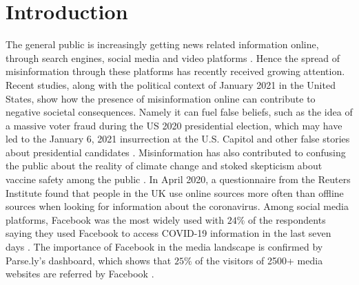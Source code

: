 \documentclass[review]{elsarticle}
\begin{document}
\linenumbers

\section{Introduction}

The general public is increasingly getting news related information online, through search engines, social media and video platforms \citep{mitchell2016modern}.
Hence the spread of misinformation through these platforms has recently received growing attention.
Recent studies, along with the political context of January 2021 in the United States, show how the presence of misinformation online can contribute to negative societal consequences.
Namely it can fuel false beliefs, such as the idea of a massive voter fraud during the US 2020 presidential election, which may have led to the January 6, 2021 insurrection at the U.S. Capitol \citep{benkler2020mail} and other false stories about presidential candidates \citep{allcott2017social}. 
Misinformation has also contributed to confusing the public about the reality of climate change \citep{brulle30years, porter2019can} and stoked skepticism about vaccine safety among the public \citep{featherstone2020feeling, lahouati2020spread}. 
In April 2020, a questionnaire from the Reuters Institute found that people in the UK use online sources more often than offline sources when looking for information about the coronavirus. 
Among social media platforms, Facebook was the most widely used with $24\%$ of the respondents saying they used Facebook to access COVID-19 information in the last seven days \citep{fletcher2020information}.
The importance of Facebook in the media landscape is confirmed by Parse.ly’s dashboard, which shows that $25\%$ of the visitors of 2500+ media websites are referred by Facebook \citep{parslyDashboard}.
\end{document}
